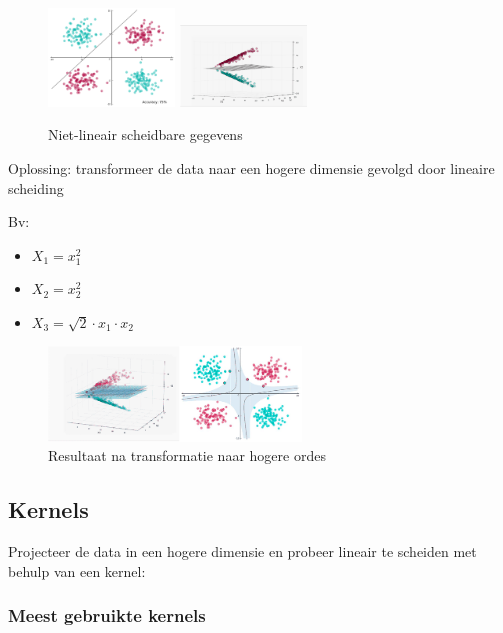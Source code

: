 \documentclass{article}
\begin{document}
\begin{figure}[H]
    \centering
    \includegraphics[width=0.3\textwidth]{svm-niet-lineair.png}
    \includegraphics[width=0.3\textwidth]{svm-niet-lineair2.png}
    \caption{Niet-lineair scheidbare gegevens}
\end{figure}

Oplossing: transformeer de data naar een hogere dimensie gevolgd door lineaire scheiding

Bv:

\begin{itemize}
    \item $X_1 = x_1^2$
    \item $X_2 = x_2^2$
    \item $X_3= \sqrt{2}\cdot x_1 \cdot x_2$
\end{itemize}


\begin{figure}[H]
    \centering
    \includegraphics[width=0.6\textwidth]{svm-niet-lineair3.png}
    \caption{Resultaat na transformatie naar hogere ordes}
\end{figure}

\subsection{Kernels}

Projecteer de data in een hogere dimensie en probeer lineair te scheiden met behulp van een kernel:

\subsubsection{Meest gebruikte kernels}
\end{document}
